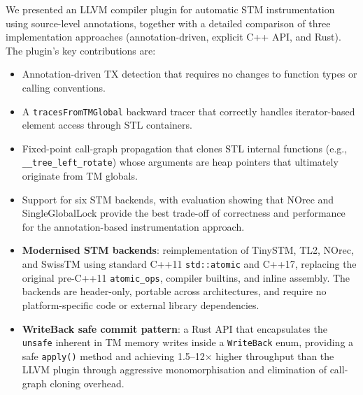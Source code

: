 \documentclass[article,12pt]{article}
\begin{document}
We presented an LLVM compiler plugin for automatic STM instrumentation using
source-level annotations, together with a detailed comparison of three
implementation approaches (annotation-driven, explicit C++ API, and Rust).
The plugin's key contributions are:

\begin{itemize}
\item Annotation-driven TX detection that requires no changes to function types
  or calling conventions.
\item A \texttt{tracesFromTMGlobal} backward tracer that correctly handles
  iterator-based element access through STL containers.
\item Fixed-point call-graph propagation that clones STL internal functions
  (e.g., \texttt{\_\_tree\_left\_rotate}) whose arguments are heap pointers
  that ultimately originate from TM globals.
\item Support for six STM backends, with evaluation showing that NOrec and
  SingleGlobalLock provide the best trade-off of correctness and performance
  for the annotation-based instrumentation approach.
\item \textbf{Modernised STM backends}: reimplementation of TinySTM, TL2, NOrec,
  and SwissTM using standard C++11 \texttt{std::atomic} and C++17,
  replacing the original pre-C++11 \texttt{atomic\_ops}, compiler builtins,
  and inline assembly.  The backends are header-only, portable across
  architectures, and require no platform-specific code or external library
  dependencies.
\item \textbf{WriteBack safe commit pattern}: a Rust API that encapsulates the
  \texttt{unsafe} inherent in TM memory writes inside a \texttt{WriteBack}
  enum, providing a safe \texttt{apply()} method and achieving 1.5--12$\times$
  higher throughput than the LLVM plugin through aggressive monomorphisation
  and elimination of call-graph cloning overhead.
\end{itemize}
\end{document}
